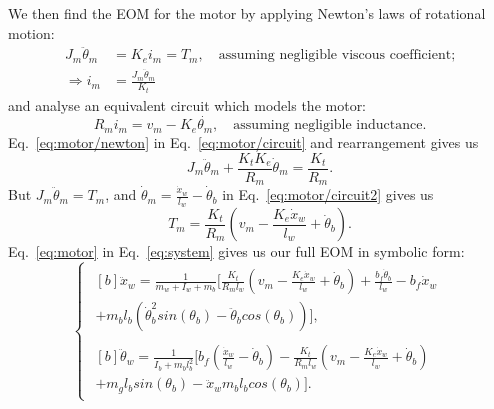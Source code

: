 \documentclass[11pt]{article} %
\begin{document}
We then find the \ac{EOM} for the motor by applying Newton's laws of rotational motion:
\begin{align}
  J_m \ddot{\theta}_m &= K_e i_m = T_m, \quad \text{assuming negligible viscous coefficient;}\nonumber \\
  \Rightarrow i_m &= \frac{J_m \ddot{\theta}_m}{K_t}\label{eq:motor/newton}
\end{align}
and analyse an equivalent circuit which models the motor:
\begin{equation}\label{eq:motor/circuit}
R_m i_m = v_m - K_e \dot{\theta_m}, \quad \text{assuming negligible inductance.}
\end{equation}
Eq.~\eqref{eq:motor/newton} in Eq.~\eqref{eq:motor/circuit} and rearrangement gives us
\begin{equation}\label{eq:motor/circuit2}
  J_m \ddot{\theta}_m
  + \frac{K_t K_e}{R_m} \dot{\theta}_m
  = \frac{K_t}{R_m}.
\end{equation}
But $J_m \ddot{\theta}_m = T_m$, and $\dot{\theta}_m = \frac{\dot{x}_w}{l_w} - \dot{\theta}_b$ in Eq.~\eqref{eq:motor/circuit2} gives us
\begin{equation}\label{eq:motor}
  T_m = \frac{K_t}{R_m}\left(
    v_m
    - \frac{K_e \dot{x}_w}{l_w}
    + \dot{\theta}_b
  \right).
\end{equation}
Eq.~\eqref{eq:motor} in Eq.~\eqref{eq:system} gives us our full \ac{EOM} in symbolic form:
\begin{equation}
  \begin{cases}
    \begin{aligned}[b]
      \ddot{x}_w =
      \frac{1}{m_w + I_w + m_b}\bigg[
      \frac{K_t}{R_m l_w}\left(
        v_m
        - \frac{K_e \dot{x}_w}{l_w}
        + \dot{\theta}_b
      \right)
      + \frac{b_f \dot{\theta}_b}{l_w}
      - b_f \dot{x}_w\\
      + m_b l_b \left(
        \dot{\theta}^2_b sin(\theta_b)
        - \ddot{\theta}_b cos(\theta_b)
      \right)
      \bigg],
    \end{aligned}\\[1em]
  \begin{aligned}[b]
    \ddot{\theta}_w =
    \frac{1}{I_b + m_b l_b^2}\bigg[
      b_f\left(
        \frac{\dot{x}_w}{l_w}
        - \dot{\theta}_b
      \right)
      - \frac{K_t}{R_m l_w}\left(
        v_m
        - \frac{K_e \dot{x}_w}{l_w}
        + \dot{\theta}_b
      \right)\\
      + m_g l_b sin(\theta_b)
      - \ddot{x}_w m_b l_b cos(\theta_b)
    \bigg].
    \end{aligned}
  \end{cases}
\end{equation}
\end{document}
